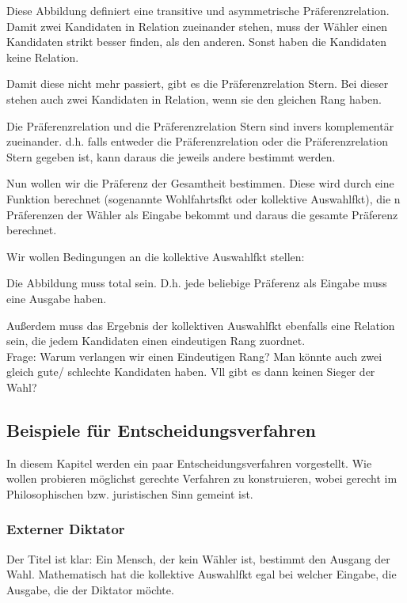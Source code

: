 \documentclass[]{article}
\begin{document}
Diese Abbildung definiert eine transitive und asymmetrische Präferenzrelation. Damit zwei Kandidaten in Relation zueinander stehen, muss der Wähler einen Kandidaten strikt besser finden, als den anderen. Sonst haben die Kandidaten keine Relation. 

Damit diese nicht mehr passiert, gibt es die Präferenzrelation Stern. Bei dieser stehen auch zwei Kandidaten in Relation, wenn sie den gleichen Rang haben. 

Die Präferenzrelation und die Präferenzrelation Stern sind invers komplementär zueinander. d.h. falls entweder die Präferenzrelation oder die Präferenzrelation Stern gegeben ist, kann daraus die jeweils andere bestimmt werden. 

Nun wollen wir die Präferenz der Gesamtheit bestimmen. Diese wird durch eine Funktion berechnet (sogenannte Wohlfahrtsfkt oder kollektive Auswahlfkt), die n Präferenzen der Wähler als Eingabe bekommt und daraus die gesamte Präferenz berechnet. 

Wir wollen Bedingungen an die kollektive Auswahlfkt stellen: 

Die Abbildung muss total sein. D.h. jede beliebige Präferenz als Eingabe muss eine Ausgabe haben. 

Außerdem muss das Ergebnis der kollektiven Auswahlfkt ebenfalls eine Relation sein, die jedem Kandidaten einen eindeutigen Rang zuordnet.  \\ 

Frage: Warum verlangen wir einen Eindeutigen Rang? Man könnte auch zwei gleich gute/ schlechte Kandidaten haben. Vll gibt es dann keinen Sieger der Wahl? 

\subsection{Beispiele für Entscheidungsverfahren}

In diesem Kapitel werden ein paar Entscheidungsverfahren vorgestellt. Wie wollen probieren möglichst gerechte Verfahren zu konstruieren, wobei gerecht im Philosophischen bzw. juristischen Sinn gemeint ist. 

\subsubsection*{Externer Diktator}

Der Titel ist klar: Ein Mensch, der kein Wähler ist, bestimmt den Ausgang der Wahl. Mathematisch hat die kollektive Auswahlfkt egal bei welcher Eingabe, die Ausgabe, die der Diktator möchte. 
\end{document}
